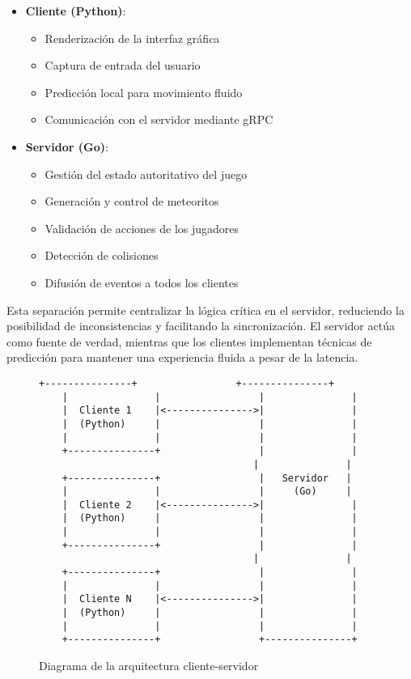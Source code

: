 \documentclass[12pt,letterpaper]{article}
\begin{document}
\begin{itemize}
    \item \textbf{Cliente (Python)}:
    \begin{itemize}
        \item Renderización de la interfaz gráfica
        \item Captura de entrada del usuario
        \item Predicción local para movimiento fluido
        \item Comunicación con el servidor mediante gRPC
    \end{itemize}
    
    \item \textbf{Servidor (Go)}:
    \begin{itemize}
        \item Gestión del estado autoritativo del juego
        \item Generación y control de meteoritos
        \item Validación de acciones de los jugadores
        \item Detección de colisiones
        \item Difusión de eventos a todos los clientes
    \end{itemize}
\end{itemize}

Esta separación permite centralizar la lógica crítica en el servidor, reduciendo la posibilidad de inconsistencias y facilitando la sincronización. El servidor actúa como fuente de verdad, mientras que los clientes implementan técnicas de predicción para mantener una experiencia fluida a pesar de la latencia.

\begin{figure}[H]
    \centering
    \begin{lstlisting}[language=text]
    +---------------+                 +---------------+
    |               |                 |               |
    |  Cliente 1    |<--------------->|               |
    |  (Python)     |                 |               |
    |               |                 |               |
    +---------------+                 |               |
                                     |               |
    +---------------+                 |   Servidor   |
    |               |                 |     (Go)     |
    |  Cliente 2    |<--------------->|               |
    |  (Python)     |                 |               |
    |               |                 |               |
    +---------------+                 |               |
                                     |               |
    +---------------+                 |               |
    |               |                 |               |
    |  Cliente N    |<--------------->|               |
    |  (Python)     |                 |               |
    |               |                 |               |
    +---------------+                 +---------------+
    \end{lstlisting}
    \caption{Diagrama de la arquitectura cliente-servidor}
\end{figure}
\end{document}
